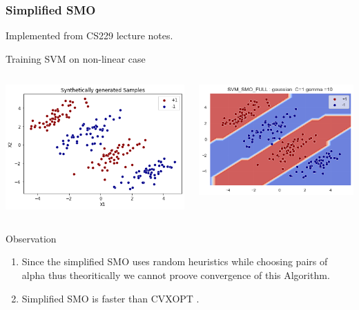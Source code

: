 \documentclass[12pt,t]{beamer}
\begin{document}
\begin{frame}
    \frametitle{Simplified SMO}
    \scriptsize
    Implemented from CS229 lecture notes.

    \large Training SVM on non-linear case 
    \begin{columns}[]
        \begin{column}[]{0.5\linewidth}
            \includegraphics[width=\linewidth]{images/p1c/data.png}
        \end{column}
        \begin{column}[]{0.5\linewidth}
            \includegraphics[width=\linewidth]{images/p1c/simplesmo_rbf.png}
        \end{column}

    \end{columns}

    \scriptsize
    \begin{block}{Observation}
        \begin{enumerate}
            \item Since the simplified SMO uses random heuristics while choosing pairs of alpha 
                thus theoritically we cannot proove convergence of this Algorithm.
            \item Simplified SMO is faster than CVXOPT .
        \end{enumerate}
    \end{block}
    
    
\end{frame}
\end{document}
